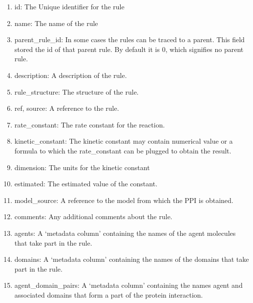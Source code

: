 \documentclass[msc,deptreport,ai]{infthesis}      %
\begin{document}
\begin{enumerate}
\begin{enumerate}
	\item id: The Unique identifier for the rule
	\item name: The name of the rule
	\item parent\_rule\_id: In some cases the rules can be traced to a parent. This field stored the id of that parent rule. By default it is 0, which signifies no parent rule.
	\item description: A description of the rule.
	\item rule\_structure: The structure of the rule. 
	\item ref, source: A reference to the rule.
	\item rate\_constant: The rate constant for the reaction.
	\item kinetic\_constant: The kinetic constant may contain numerical value or a formula to which the rate\_constant can be plugged to obtain the result.
	\item dimension: The units for the kinetic constant
	\item estimated: The estimated value of the constant.
	\item model\_source: A reference to the model from which the PPI is obtained.
	\item comments: Any additional comments about the rule.
	\item agents: A `metadata column' containing the names of the agent molecules that take part in the rule.
	\item domains: A `metadata column' containing the names of the domains that take part in the rule.
	\item agent\_domain\_pairs:	A `metadata column' containing the names agent and associated domains that form a part of the protein interaction.
	\end{enumerate}
\end{enumerate}
\end{document}
